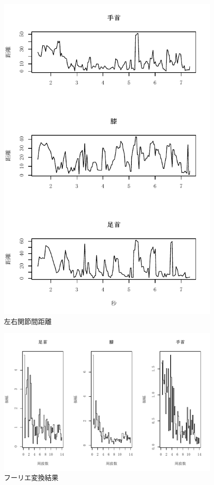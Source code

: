 \documentclass[a4j,10.5pt]{jreport}
\begin{document}
\begin{figure}
    \centering
    \includegraphics[width=\linewidth]{figs/distance.pdf}
    \caption{左右関節間距離}
    \label{fig:lengthdata}
\end{figure}
\begin{figure}
    \centering
    \includegraphics{figs/frequency.pdf}
    \caption{フーリエ変換結果}
    \label{fig:frequency}
\end{figure}
\end{document}
